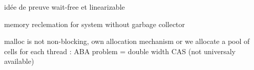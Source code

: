 idée de preuve wait-free et linearizable

memory reclemation for system without garbage collector

malloc is not non-blocking, own allocation mechanism or we allocate a pool of
cells for each thread : ABA problem = double width CAS (not universaly
available)
